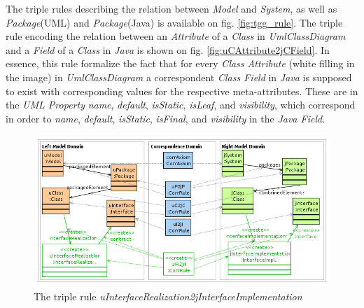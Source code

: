 \documentclass[tuberlin,cic,tc,english,noabntcite]{iiufrgs}
\begin{document}
The triple rules describing the relation between \emph{Model} and \emph{System}, as well as \emph{Package}(UML) and \emph{Package}(Java) is available on fig. \ref{fig:tgg_rule}. The triple rule encoding the relation between an \emph{Attribute} of a \emph{Class} in \emph{UmlClassDiagram} and a \emph{Field} of a \emph{Class} in \emph{Java} is shown on fig. \ref{fig:uCAttribute2jCField}. In essence, this rule formalize the fact that for every \emph{Class Attribute} (white filling in the image) in \emph{UmlClassDiagram} a correspondent \emph{Class Field} in \emph{Java} is supposed to exist with corresponding values for the respective meta-attributes. These are in the \emph{UML Property} \emph{name}, \emph{default}, \emph{isStatic}, \emph{isLeaf}, and \emph{visibility}, which correspond in order to \emph{name}, \emph{default}, \emph{isStatic}, \emph{isFinal}, and \emph{visibility} in the \emph{Java Field}.

\begin{figure}[h]
    \caption{The triple rule \emph{uInterfaceRealization2jInterfaceImplementation}}
    \begin{center}
       	\includegraphics[width=.7\textwidth]{uIRealization2jIImplementation}
    \end{center}
    \label{fig:uIRealization2jIImplementation}
\end{figure}
\end{document}
